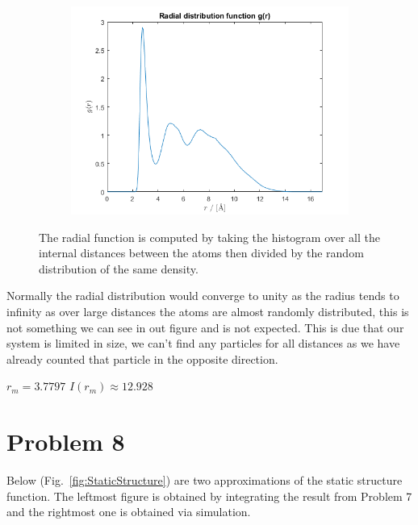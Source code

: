 \begin{figure}[H]
\centering
\captionsetup[subfigure]{justification=centering}
\begin{subfigure}[b]{0.40\textwidth}
	\centering
	\includegraphics[width=\textwidth]{graphics/task7/radial.png}
\end{subfigure}
\caption{The radial function is computed by taking the histogram over all the internal distances between the atoms then divided by the random distribution of the same density.}
\label{fig:radial}
\end{figure}

Normally the radial distribution would converge to unity as the radius tends to infinity as over large distances the atoms are almost randomly distributed, this is not something we can see in out figure and is not expected. This is due that our system is limited in size, we can't find any particles for all distances as we have already counted that particle in the opposite direction.

$r_m = 3.7797$
$I(r_m) \approx 12.928 $

\section*{Problem 8}

Below (Fig.~\ref{fig:StaticStructure}) are two approximations of the static structure function. The leftmost figure is obtained by integrating the result from Problem 7 and the rightmost one is obtained via simulation. 


